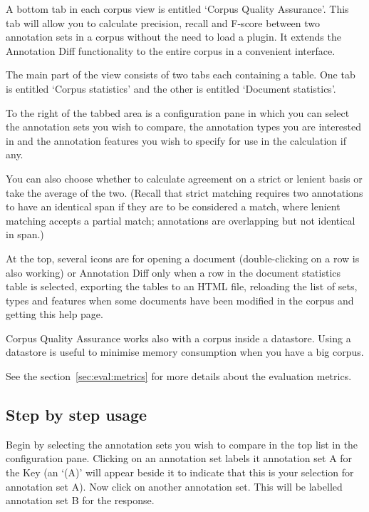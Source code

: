 A bottom tab in each corpus view is entitled `Corpus Quality
Assurance'. This tab will allow you to calculate precision, recall and F-score
between two annotation sets in a corpus without the need to load a plugin. It
extends the Annotation Diff functionality to the entire corpus in a convenient
interface.

The main part of the view consists of two tabs each containing a table. One tab
is entitled `Corpus statistics' and the other is entitled `Document
statistics'.

To the right of the tabbed area is a configuration pane in which
you can select the annotation sets you wish to compare, the annotation types
you are interested in and the annotation features you wish to specify for use
in the calculation if any.

You can also choose whether to calculate agreement
on a strict or lenient basis or take the average of the two. (Recall that strict
matching requires two annotations to have an identical span if they are to be
considered a match, where lenient matching accepts a partial match; annotations
are overlapping but not identical in span.)

At the top, several icons are for opening a document (double-clicking on a
row is also working) or Annotation Diff only when a row in the document
statistics table is selected, exporting the tables to an HTML file,
reloading the list of sets, types and features when some documents have been
modified in the corpus and getting this help page.

Corpus Quality Assurance works also with a corpus inside a datastore. Using a
datastore is useful to minimise memory consumption when you have a big
corpus.

See the section~\ref{sec:eval:metrics} for more details about the evaluation
metrics.

\subsection{Step by step usage}

Begin by selecting the annotation sets you wish to compare in the top list
in the configuration pane. Clicking on an annotation set labels it
annotation set A for the Key (an `(A)' will appear beside it to indicate
that this is your selection for annotation set A). Now click on another
annotation set. This will be labelled annotation set B for the response.

